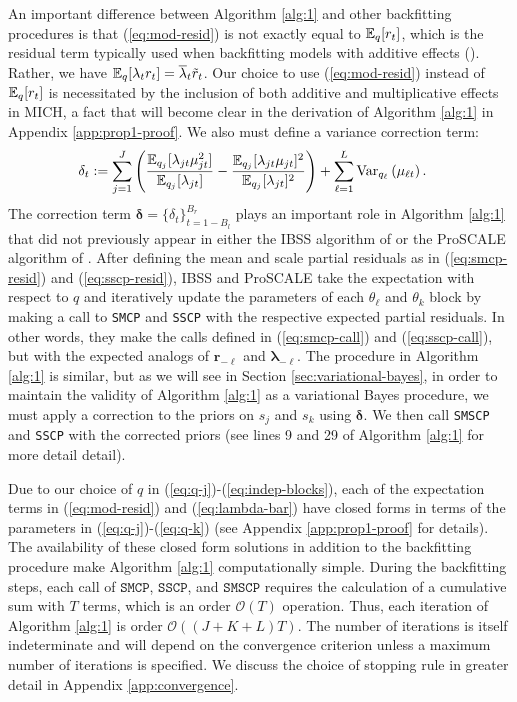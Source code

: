 An important difference between Algorithm \ref{alg:1} and other backfitting procedures is that (\ref{eq:mod-resid}) is not exactly equal to $\mathbb{E}_q[r_t]$, which is the residual term typically used when backfitting models with additive effects (\citealp{Breiman85,Hastie90,Friedman00,Wang20}). Rather, we have $\mathbb{E}_q[\lambda_t r_t] = \overline{\lambda}_t \tilde{r}_t$. Our choice to use (\ref{eq:mod-resid}) instead of $\mathbb{E}_q[r_t]$ is necessitated by the inclusion of both additive and multiplicative effects in MICH, a fact that will become clear in the derivation of Algorithm \ref{alg:1} in Appendix \ref{app:prop1-proof}. We also must define a variance correction term:
\begin{align}\label{eq:delta}
    \delta_t &:= \sum_{j=1}^J\left(\frac{\mathbb{E}_{q_j}[\lambda_{jt} \mu^2_{jt}]}{\mathbb{E}_{q_j}[\lambda_{jt}]} -\frac{\mathbb{E}_{q_j}[\lambda_{jt} \mu_{jt}]^2}{\mathbb{E}_{q_j}[\lambda_{jt}]^2} \right) +\sum_{\ell=1}^L  \text{Var}_{q_\ell}\left(\mu_{\ell t} \right).
\end{align}
The correction term $\boldsymbol{\delta} = \{\delta_{t}\}_{t=1-B_l}^{B_r}$ plays an important role in Algorithm \ref{alg:1} that did not previously appear in either the IBSS algorithm of \cite{Wang20} or the ProSCALE algorithm of \cite{Cappello22}. After defining the mean and scale partial residuals as in (\ref{eq:smcp-resid}) and (\ref{eq:sscp-resid}), IBSS and ProSCALE take the expectation with respect to $q$ and iteratively update the parameters of each $\theta_\ell$ and $\theta_k$ block by making a call to \texttt{SMCP} and \texttt{SSCP} with the respective expected partial residuals. In other words, they make the calls defined in (\ref{eq:smcp-call}) and (\ref{eq:sscp-call}), but with the expected analogs of $\mathbf{r}_{-\ell}$ and $\boldsymbol{\lambda}_{-\ell}$. The procedure in Algorithm \ref{alg:1} is similar, but as we will see in Section \ref{sec:variational-bayes}, in order to maintain the validity of Algorithm \ref{alg:1} as a variational Bayes procedure, we must apply a correction to the priors on $s_j$ and $s_k$ using $\boldsymbol{\delta}$. We then call \texttt{SMSCP} and \texttt{SSCP} with the corrected priors (see lines 9 and 29 of Algorithm \ref{alg:1} for more detail detail). 

Due to our choice of $q$ in (\ref{eq:q-j})-(\ref{eq:indep-blocks}), each of the expectation terms in (\ref{eq:mod-resid}) and (\ref{eq:lambda-bar}) have closed forms in terms of the parameters in (\ref{eq:q-j})-(\ref{eq:q-k}) (see Appendix \ref{app:prop1-proof} for details). The availability of these closed form solutions in addition to the backfitting procedure make Algorithm \ref{alg:1} computationally simple. During the backfitting steps, each call of $\texttt{SMCP}$, $\texttt{SSCP}$, and $\texttt{SMSCP}$  requires the calculation of a cumulative sum with $T$ terms, which is an order $\mathcal{O}(T)$ operation. Thus, each iteration of Algorithm \ref{alg:1} is order $\mathcal{O}((J+K+L)T)$. The number of iterations is itself indeterminate and will depend on the convergence criterion unless a maximum number of iterations is specified. We discuss the choice of stopping rule in greater detail in Appendix \ref{app:convergence}.  

